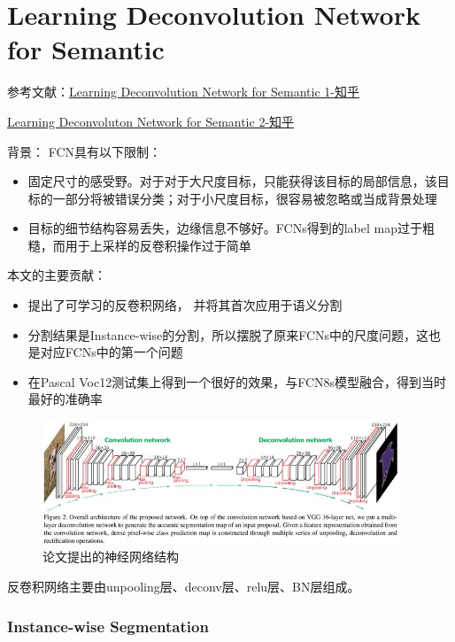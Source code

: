 \section{Learning Deconvolution Network for Semantic}
参考文献：\href{https://zhuanlan.zhihu.com/p/26291607}{Learning Deconvolution Network for Semantic 1-知乎}

\href{https://zhuanlan.zhihu.com/p/27580384}{Learning Deconvoluton Network for Semantic 2-知乎}

背景：
FCN具有以下限制：
\begin{itemize}
\item 固定尺寸的感受野。对于对于大尺度目标，只能获得该目标的局部信息，该目标的一部分将被错误分类；对于小尺度目标，很容易被忽略或当成背景处理

\item 目标的细节结构容易丢失，边缘信息不够好。FCNs得到的label map过于粗糙，而用于上采样的反卷积操作过于简单

\end{itemize}

本文的主要贡献：
\begin{itemize}
\item 提出了可学习的反卷积网络， 并将其首次应用于语义分割
\item 分割结果是Instance-wise的分割，所以摆脱了原来FCNs中的尺度问题，这也是对应FCNs中的第一个问题
\item 在Pascal Voc12测试集上得到一个很好的效果，与FCN8s模型融合，得到当时最好的准确率
\end{itemize}

\begin{figure}[!hbtp]
\centering
\includegraphics[width=0.95\textwidth]{SemanticSLAM/LearnDeconv0.jpg}
\caption{论文提出的神经网络结构}
\label{LearnDeconv0}
\end{figure}

反卷积网络主要由unpooling层、deconv层、relu层、BN层组成。

\subsubsection{Instance-wise Segmentation}

